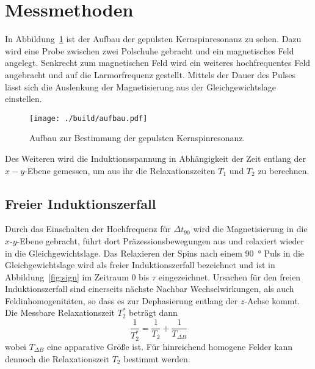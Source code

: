 \section{Messmethoden}%
\label{sec:messmethoden}
In Abbildung~\ref{fig:aufbau} ist der Aufbau der gepulsten Kernspinresonanz zu
sehen. 
Dazu wird eine Probe zwischen zwei Polschuhe gebracht und ein magnetisches Feld
angelegt.
Senkrecht zum magnetischen Feld wird ein weiteres hochfrequentes Feld angebracht
und auf die Larmorfrequenz gestellt. 
Mittels der Dauer des Pulses lässt sich die Auslenkung der
Magnetisierung aus der Gleichgewichtslage einstellen. 
\begin{figure}[h]
		\centering
		\texttt{[image: ./build/aufbau.pdf]}
		\caption{Aufbau zur Bestimmung der gepulsten Kernspinresonanz.
		\cite{anleitung}}%
		\label{fig:aufbau}
\end{figure}
Des Weiteren wird die Induktionsspannung in Abhängigkeit der Zeit entlang der $x-y$-Ebene gemessen,
um aus ihr die Relaxationszeiten $T_1$ und $T_2$ zu berechnen.

\subsection{Freier Induktionszerfall}%
\label{sub:freie_induktionszerfall}
Durch das Einschalten der Hochfrequenz für $\Delta t_{90}$ wird die
Magnetisierung in die $x$-$y$-Ebene gebracht, führt dort Präzessionsbewegungen aus und 
relaxiert wieder in die Gleichgewichtslage. 
Das Relaxieren der Spins nach einem \SI{90}{\degree} Puls in die
Gleichgewichtslage wird als freier Induktionszerfall bezeichnet und ist in
Abbildung~\ref{fig:sign} im Zeitraum 0 bis $\tau$ eingezeichnet.
Ursachen für den freien Induktionszerfall sind einerseits nächste Nachbar
Wechselwirkungen, als auch Feldinhomogenitäten, so dass es zur Dephasierung
entlang der $z$-Achse kommt.
Die Messbare Relaxationszeit $T_2^*$ beträgt dann
\begin{equation}
		\frac{1}{T_2^*} = \frac{1}{T_2} + \frac{1}{T_{\Delta B}}
\end{equation}
wobei $T_{\Delta B}$ eine apparative Größe ist. 
Für hinreichend homogene Felder kann dennoch die Relaxationszeit $T_2$ 
bestimmt werden. 

